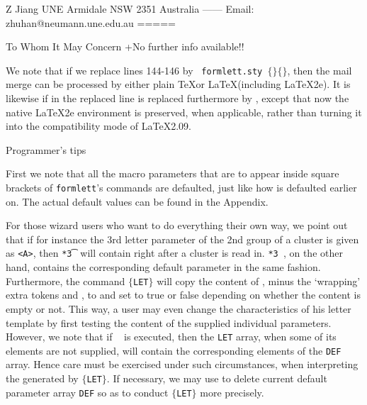 {Z Jiang
UNE
Armidale NSW 2351
Australia
------
Email: zhuhan@neumann.une.edu.au
=====
\endblockmode
{}
\endfile

\paradefaults To Whom It May Concern
  +No further info available{!}!
\beginlabels
{}%
\endlabels

\unsetraw
\rm

We note that if we replace lines 144-146 by {\tt\string\space
formlett.sty \string\initstyle$\{\}\{\}$}, then the mail merge can be
processed by either plain \TeX\space or \LaTeX\space (including
\LaTeX2e). It is likewise if {\tt\string\initstyle} in the replaced
line is replaced furthermore by {\tt\string\initclass}, except that now
the native \LaTeX2e environment is preserved, when applicable, rather
than turning it into the compatibility mode of \LaTeX2.09.

\bigskip
{\lbold Programmer's tips}

\smallskip

First we note that all the macro parameters that are to appear inside
square brackets of {\tt formlett}'s commands are defaulted, just like
how {\tt\string\paras[$m$][$n$]} is defaulted earlier on. The actual
default values can be found in the Appendix.

\medskip

For those wizard users who want to do everything their own way, we point
out that if for instance the 3rd letter parameter of the 2nd group of a
cluster is given as {\tt<A>}, then {\tt \string{}*3\t} will contain
{\tt \string\b@group \string{}\string\e@group} right after
a cluster is read in. {\tt \string{}*3\string~}, on the other hand,
contains the corresponding default parameter in the same fashion.
Furthermore, the command {\tt\string\checkparas[$m$][$n$]$\{$LET$\}$}
will copy the content of {\tt\string\paras[$m$][$n$]}, minus the
`wrapping' extra tokens {\tt\string\b@group\string\relax} and
{\tt\string\e@group}, to {\tt\string\cachedata} and set
{\tt\string\ifemptyparas} to true or false depending on whether the
content is empty or not. This way, a user may even change the
characteristics of his letter template by first testing the content of
the supplied individual parameters. However, we note that if {\tt\string
\loaddefaultparas} is executed, then the {\tt LET} array, when some of
its elements are not supplied, will contain the corresponding elements
of the {\tt DEF} array. Hence care must be exercised under such
circumstances, when interpreting the {\tt\string\cachedata} generated by
{\tt\string\checkparas[$m$][$n$]$\{$LET$\}$}. If necessary, we may use
{\tt\string\delparadefaults} to delete current default parameter array
{\tt DEF} so as to conduct {\tt\string\checkparas$\{$LET$\}$} more
precisely.

}
